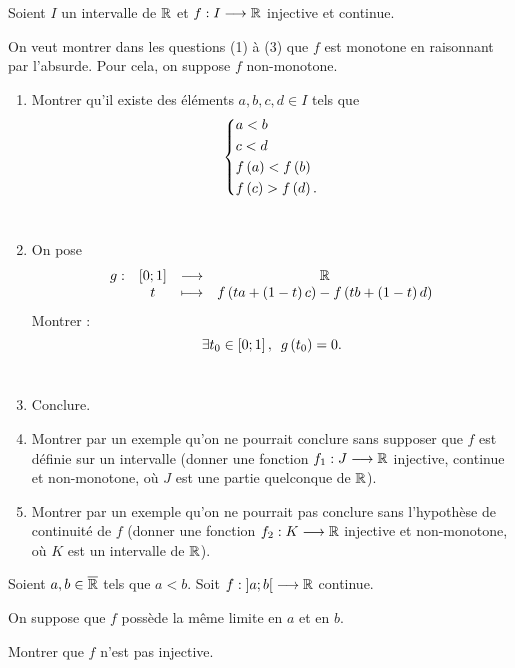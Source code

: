 \begin{exo}
Soient \(I\) un intervalle de \(\mathbb{R}\) et \(f:I\longrightarrow\mathbb{R}\) injective et continue.

On veut montrer dans les questions (1) à (3) que \(f\) est monotone en raisonnant par l'absurde. Pour cela, on suppose \(f\) non-monotone.

\begin{enumerate}
\item Montrer qu'il existe des éléments \(a,b,c,d\in I\) tels que \[\begin{dcases}a<b \\ c<d \\ f\left(a\right)<f\left(b\right) \\ f\left(c\right)>f\left(d\right).\end{dcases}\] \\

\item On pose \[\begin{array}[t]{cccc}g : & \left[0;1\right] & \longrightarrow & \mathbb{R} \\ & t & \longmapsto & f\left(ta+\left(1-t\right)c\right)-f\left(tb+\left(1-t\right)d\right)\end{array}\] Montrer : \[\quantifs{\exists t_0\in\intervii{0}{1}}g\paren{t_0}=0.\] \\

\item Conclure. \\

\item Montrer par un exemple qu'on ne pourrait conclure sans supposer que \(f\) est définie sur un intervalle (\cad donner une fonction \(f_1:J\longrightarrow\mathbb{R}\) injective, continue et non-monotone, où \(J\) est une partie quelconque de \(\mathbb{R}\)). \\

\item Montrer par un exemple qu'on ne pourrait pas conclure sans l'hypothèse de continuité de \(f\) (\cad donner une fonction \(f_2:K\longrightarrow\mathbb{R}\) injective et non-monotone, où \(K\) est un intervalle de \(\mathbb{R}\)).
\end{enumerate}
\end{exo}

\begin{corr}
\end{corr}

\begin{exo}
Soient \(a,b\in\overline{\mathbb{R}}\) tels que \(a<b\). Soit \(f:\left]a;b\right[\longrightarrow\mathbb{R}\) continue.

On suppose que \(f\) possède la même limite en \(a\) et en \(b\).

Montrer que \(f\) n'est pas injective.
\end{exo}

